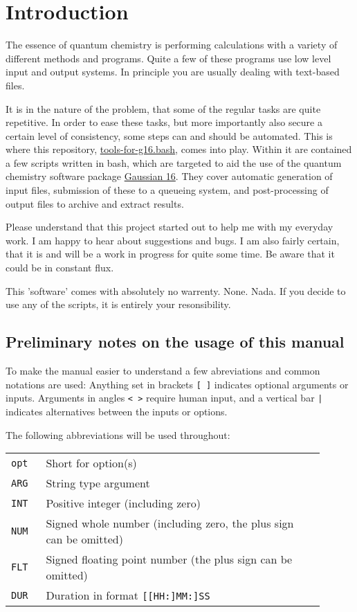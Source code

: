 \documentclass[   %
  final,          %
  a4paper         %
]{article}
\begin{document}
\section{Introduction}

The essence of quantum chemistry is performing calculations with a variety of different methods and programs.
Quite a few of these programs use low level input and output systems.
In principle you are usually dealing with text-based files.

It is in the nature of the problem, 
that some of the regular tasks are quite repetitive.
In order to ease these tasks,
but more importantly also secure a certain level of consistency,
some steps can and should be automated.
This is where this repository, 
\href{https://github.com/polyluxus/tools-for-g16.bash}{tools-for-g16.bash},
comes into play.
Within it are contained a few scripts written in bash,
which are targeted to aid the use of the quantum chemistry software package 
\href{http://gaussian.com/}{Gaussian 16}.
They cover automatic generation of input files,
submission of these to a queueing system,
and post-processing of output files to archive and extract results.

Please understand that this project started out to help me with my everyday work. 
I am happy to hear about suggestions and bugs. 
I am also fairly certain, that it is and will be a work in progress for quite some time.
Be aware that it could be in constant flux. 

This 'software' comes with absolutely no warrenty. None. Nada.
If you decide to use any of the scripts, it is entirely your resonsibility.

\subsection{Preliminary notes on the usage of this manual}

To make the manual easier to understand a few abreviations 
and common notations are used:
Anything set in brackets \lstinline{[ ]} indicates optional arguments or inputs.
Arguments in angles \lstinline{< >} require human input, 
and a vertical bar \lstinline{|} indicates alternatives between the inputs or options.

The following abbreviations will be used throughout:

\begin{tabular}{p{0.1\linewidth}p{0.8\linewidth}}
  {\lstinline`opt`} & Short for option(s) \\
  {\lstinline`ARG`} & String type argument \\
  {\lstinline`INT`} & Positive integer (including zero) \\
  {\lstinline`NUM`} & Signed whole number (including zero, the plus sign can be omitted) \\
  {\lstinline`FLT`} & Signed floating point number (the plus sign can be omitted) \\
  {\lstinline`DUR`} & Duration in format {\lstinline![[HH:]MM:]SS!}  \\
\end{tabular}
\end{document}
